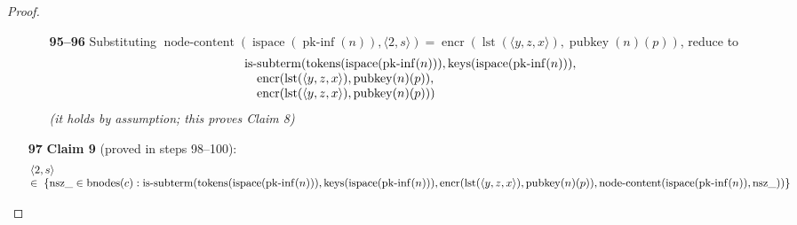 \documentclass[11pt]{article}
\theoremstyle{plain}
\begin{document}
\begin{proof}
\begin{itemize}[leftmargin=2.8em, itemsep=4pt, parsep=1pt]
  \begin{itemize}[leftmargin=2.8em, itemsep=4pt, parsep=1pt]
  \item[\textbf{95--96}] Substituting $\operatorname{node\text{-}content}(\operatorname{ispace}(\operatorname{pk\text{-}inf}(n)), \langle 2, s \rangle) = \operatorname{encr}(\operatorname{lst}(\langle y, z, x \rangle), \operatorname{pubkey}(n)(p))$, reduce to
\begin{equation*}
\begin{array}{@{}l@{}} \operatorname{is\text{-}subterm}(\operatorname{tokens}(\operatorname{ispace}(\operatorname{pk\text{-}inf}(n))), \operatorname{keys}(\operatorname{ispace}(\operatorname{pk\text{-}inf}(n))), \\ \quad \operatorname{encr}(\operatorname{lst}(\langle y, z, x \rangle), \operatorname{pubkey}(n)(p)), \\ \quad \operatorname{encr}(\operatorname{lst}(\langle y, z, x \rangle), \operatorname{pubkey}(n)(p))) \end{array}
\end{equation*}
  \emph{(it holds by assumption; this proves Claim 8)}
  \end{itemize}
  \item[\textbf{97}] \textbf{Claim 9} (proved in steps 98--100):
\begin{equation*}
\begin{array}{@{}l@{}} \langle 2, s \rangle \\ \in\; \{\operatorname{nsz\_} \in \operatorname{bnodes}(c) : \operatorname{is\text{-}subterm}(\operatorname{tokens}(\operatorname{ispace}(\operatorname{pk\text{-}inf}(n))), \operatorname{keys}(\operatorname{ispace}(\operatorname{pk\text{-}inf}(n))), \operatorname{encr}(\operatorname{lst}(\langle y, z, x \rangle), \operatorname{pubkey}(n)(p)), \operatorname{node\text{-}content}(\operatorname{ispace}(\operatorname{pk\text{-}inf}(n)), \operatorname{nsz\_}))\} \end{array}
\end{equation*}


\end{itemize}
\end{proof}
\end{document}
